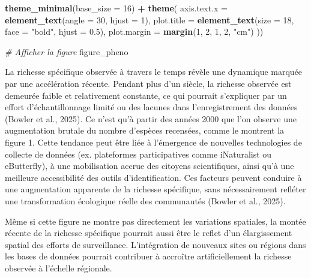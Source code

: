 \documentclass[9pt,twocolumn,twoside,]{pnas-new}
\newenvironment{Shaded}{\begin{snugshade}}{\end{snugshade}}
\newcommand{\AttributeTok}[1]{\textcolor[rgb]{0.13,0.29,0.53}{#1}}
\newcommand{\CommentTok}[1]{\textcolor[rgb]{0.56,0.35,0.01}{\textit{#1}}}
\newcommand{\DecValTok}[1]{\textcolor[rgb]{0.00,0.00,0.81}{#1}}
\newcommand{\FloatTok}[1]{\textcolor[rgb]{0.00,0.00,0.81}{#1}}
\newcommand{\FunctionTok}[1]{\textcolor[rgb]{0.13,0.29,0.53}{\textbf{#1}}}
\newcommand{\NormalTok}[1]{#1}
\newcommand{\SpecialCharTok}[1]{\textcolor[rgb]{0.81,0.36,0.00}{\textbf{#1}}}
\newcommand{\StringTok}[1]{\textcolor[rgb]{0.31,0.60,0.02}{#1}}
\begin{document}
\begin{Shaded}
\begin{Highlighting}[]
  \FunctionTok{theme\_minimal}\NormalTok{(}\AttributeTok{base\_size =} \DecValTok{16}\NormalTok{) }\SpecialCharTok{+}
  \FunctionTok{theme}\NormalTok{(}
    \AttributeTok{axis.text.x =} \FunctionTok{element\_text}\NormalTok{(}\AttributeTok{angle =} \DecValTok{30}\NormalTok{, }\AttributeTok{hjust =} \DecValTok{1}\NormalTok{),}
    \AttributeTok{plot.title =} \FunctionTok{element\_text}\NormalTok{(}\AttributeTok{size =} \DecValTok{18}\NormalTok{, }\AttributeTok{face =} \StringTok{"bold"}\NormalTok{, }\AttributeTok{hjust =} \FloatTok{0.5}\NormalTok{),}
    \AttributeTok{plot.margin =} \FunctionTok{margin}\NormalTok{(}\DecValTok{1}\NormalTok{, }\DecValTok{2}\NormalTok{, }\DecValTok{1}\NormalTok{, }\DecValTok{2}\NormalTok{, }\StringTok{"cm"}\NormalTok{)}
\NormalTok{  ))}




\CommentTok{\# Afficher la figure}
\NormalTok{figure\_pheno}
\end{Highlighting}
\end{Shaded}

La richesse spécifique observée à travers le temps révèle une dynamique
marquée par une accélération récente. Pendant plus d'un siècle, la
richesse observée est demeurée faible et relativement constante, ce qui
pourrait s'expliquer par un effort d'échantillonnage limité ou des
lacunes dans l'enregistrement des données (Bowler et al., 2025). Ce
n'est qu'à partir des années 2000 que l'on observe une augmentation
brutale du nombre d'espèces recensées, comme le montrent la figure 1.
Cette tendance peut être liée à l'émergence de nouvelles technologies de
collecte de données (ex. plateformes participatives comme iNaturalist ou
eButterfly), à une mobilisation accrue des citoyens scientifiques, ainsi
qu'à une meilleure accessibilité des outils d'identification. Ces
facteurs peuvent conduire à une augmentation apparente de la richesse
spécifique, sans nécessairement refléter une transformation écologique
réelle des communautés (Bowler et al., 2025).

Même si cette figure ne montre pas directement les variations spatiales,
la montée récente de la richesse spécifique pourrait aussi être le
reflet d'un élargissement spatial des efforts de surveillance.
L'intégration de nouveaux sites ou régions dans les bases de données
pourrait contribuer à accroître artificiellement la richesse observée à
l'échelle régionale.
\end{document}
